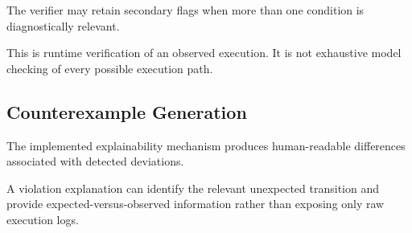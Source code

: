\documentclass[11pt,a4paper]{article}
\begin{document}
The verifier may retain secondary flags when more than one condition is diagnostically
relevant.

This is runtime verification of an observed execution. It is not exhaustive model
checking of every possible execution path.

\subsection{Counterexample Generation}

The implemented explainability mechanism produces human-readable differences associated
with detected deviations.

A violation explanation can identify the relevant unexpected transition and provide
expected-versus-observed information rather than exposing only raw execution logs.
\end{document}

